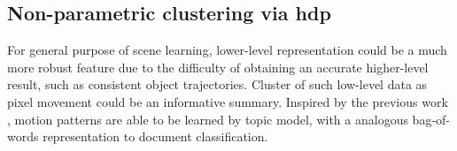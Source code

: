 

\subsection{Non-parametric clustering via \gls{hdp}}
\label{subsec:hdp-bag-of-words}
For general purpose of scene learning, lower-level representation could be a much more robust feature due to the difficulty of obtaining an accurate higher-level result, such as consistent object trajectories. Cluster of such low-level data as pixel movement could be an informative summary.
Inspired by the previous work \cite{wang2009unsupervised,kuettel2010s}, motion patterns are able to be learned by topic model, with a analogous bag-of-words representation to document classification.

